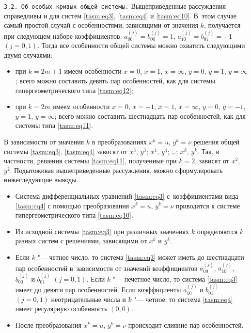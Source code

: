\texttt{3.2. Об особых кривых общей системы.} Вышеприведенные рассуждения справедливы и для систем \eqref{tasm:eq3}, \eqref{tasm:eq4}  и \eqref{tasm:eq10}. 
В~этом случае самый простой случай с особенностями, зависящими от значения $k$, получается при следующем наборе коэффициентов:
$a^{(j)}_{00}=b^{(j)}_{00}=1$, $a^{(j)}_{10}=b^{(j)}_{01}=-1$
$(j=0, 1)$. 
Тогда все особенности общей системы можно охватить
следующими двумя случаями:
\begin{itemize}
\item[а)] при $k=2m+1$ имеем особенности  $x=0$, $x=1$, $x=\infty$, $y=0$, $y=1$, ${y=\infty}$; 
всего можно составить девять пар особенностей, как для  системы гипергеометрического типа \eqref{tasm:eq12};

\item[б)] при $k=2m$ имеем особенности $x=0$, $x=-1$, $x=1$, $x=\infty$, ${y=0}$, ${y=-1}$, $y=1$, $y=\infty$; 
всего можно составить шестнадцать пар особенностей, как для системы типа \eqref{tasm:eq11}.


\end{itemize}



В зависимости от значения $k$ в преобразованиях $x^{k}=u$, $y^{k}=\nu$ решения общей системы \eqref{tasm:eq3}, \eqref{tasm:eq4} зависят от $x^{3}$, $y^{3}$; $x^{4}$, $y^{4}$; \dots; $x^{k}$, $y^{k}$. 
Так, в частности, решения системы \eqref{tasm:eq11}, полученные при $k=2$, зависят от $x^{2}$, $y^{2}$. 
Подытоживая вышеприведенные рассуждения, можно сформулировать нижеследующие выводы.

\begin{itemize}
\item[1.] Система дифференциальных уравнений \eqref{tasm:eq3} с~коэффициентами вида \eqref{tasm:eq4} с помощью преобразования $x^{k}=u$, $y^{k}=\nu$
приводится к системе гипергеометрического типа \eqref{tasm:eq10}.

\item[2.]  Из исходной системы \eqref{tasm:eq3}  при различных значениях $k$ определяются $k$ разных систем с решениями,
зависящими от $x^{k}$ и $y^{k}$.

\item[3.]   Если $k$ "--- четное число, то система \eqref{tasm:eq3} может иметь до шестнадцати пар особенностей в~зависимости от значений коэффициентов $a^{(j)}_{00}$, $a^{(j)}_{10}$, $b^{(j)}_{00}$ и  $b^{(j)}_{01}$ $(j=0, 1)$. 
Если $k$ "--- нечетное число, то система \eqref{tasm:eq3} имеет до девяти пар особенностей. 
Если коэффициенты $a^{(j)}_{10}$ и $b^{(j)}_{01}$ $(j=0, 1)$ неотрицательные числа и $k$ "--- четное, то
система \eqref{tasm:eq4}  имеет регулярную особенность $(0, 0)$.

\item[4.]   После преобразования $x^{k}=u$, $y^{k}=\nu$ происходит слияние пар особенностей.

\end{itemize}


